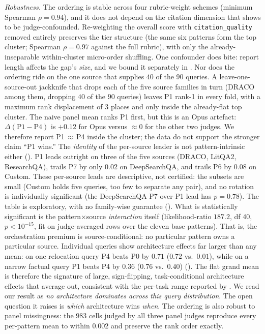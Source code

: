 \documentclass[11pt]{article}
\newcommand{\dimrow}[1]{\texttt{#1}}
\begin{document}
\emph{Robustness.} The ordering is stable across four rubric-weight schemes (minimum
Spearman $\rho=0.94$), and it does not depend on the citation dimension that
 shows to be judge-confounded. Re-weighting the overall score with
\dimrow{citation\_quality} removed entirely preserves the tier structure (the same six
patterns form the top cluster; Spearman $\rho=0.97$ against the full rubric), with only
the already-inseparable within-cluster micro-order shuffling. One confounder does bite:
report length affects the gap's \emph{size}, and we bound it separately in
. Nor does the ordering ride on the one source that supplies $40$ of
the $90$ queries. A leave-one-source-out jackknife that drops each of the five source
families in turn (DRACO among them, dropping $40$ of the $90$ queries) leaves P1 rank-1
in every fold, with a maximum rank displacement of $3$ places and only inside the
already-flat top cluster. The naive panel
mean ranks P1 first, but this is an Opus artefact: $\Delta(\text{P1}{-}\text{P4})$ is
$+0.12$ for Opus versus $\approx0$ for the other two judges. We therefore report
P1$\,\approx\,$P4 inside the cluster; the data do not support the stronger claim ``P1
wins.'' The \emph{identity} of the per-source leader is not pattern-intrinsic either
(). P1 leads outright on three of the five sources (DRACO, LitQA2,
ResearchQA), trails P7 by only $0.02$ on DeepSearchQA, and trails P6 by $0.08$ on
Custom. These per-source leads are descriptive, not certified: the
subsets are small (Custom holds five queries, too few to separate any pair), and no
rotation is individually significant (the DeepSearchQA P7-over-P1 lead
has $p{=}0.78$). The table is exploratory, with no family-wise
guarantee (). What is statistically significant is the
pattern$\times$source \emph{interaction} itself (likelihood-ratio $187.2$, df $40$,
$p<10^{-15}$, fit on judge-averaged rows over the eleven base patterns). That is, the
orchestration premium is source-conditional: no particular pattern owns a particular
source. Individual queries show architecture effects far larger than any mean: on one
relocation query P4 beats P0 by $0.71$ ($0.72$ vs.\ $0.01$), while on a
narrow factual query P1 beats P4 by $0.36$ ($0.76$ vs.\ $0.40$) (). The flat grand mean is therefore the signature of large,
sign-flipping, task-conditional architecture effects that average out, consistent with
the per-task range reported by \citet{scaling_agents2025}. We read our result as \emph{no architecture dominates across this
query distribution}. The open question it raises is \emph{which} architecture wins
\emph{when}. The ordering is also robust to panel missingness: the $983$ cells judged by
all three panel judges reproduce every per-pattern mean to within $0.002$ and preserve
the rank order exactly.
\end{document}
